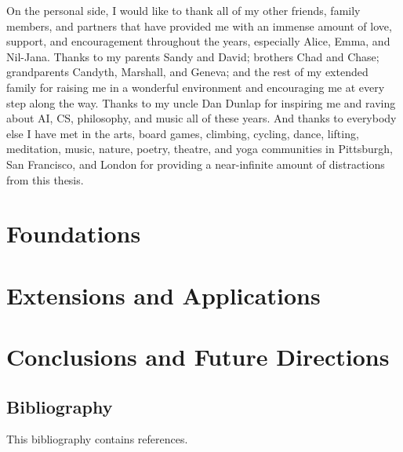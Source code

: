 \documentclass[12pt]{cmuthesis}
\begin{document}
\begin{acknowledgments}
  On the personal side, I would like to thank all of my
  other friends, family members, and partners that
  have provided me with an immense amount of love,
  support, and encouragement throughout the years,
  especially Alice, Emma, and Nil-Jana.
  Thanks to my parents Sandy and David;
  brothers Chad and Chase;
  grandparents Candyth, Marshall, and Geneva;
  and the rest of my extended family
  for raising me in a wonderful environment and
  encouraging me at every step along the way.
  Thanks to my uncle Dan Dunlap for inspiring me and
  raving about AI, CS, philosophy, and music all of these years.
  And thanks to everybody else I have met in the
  arts,
  board games,
  climbing,
  cycling,
  dance,
  lifting,
  meditation,
  music,
  nature,
  poetry,
  theatre, and
  yoga
  communities in Pittsburgh, San Francisco, and London for
  providing a near-infinite amount of distractions from
  this thesis.
\end{acknowledgments}

\pagestyle{plain}

\tableofcontents
\listoffigures
\listoftables
\listofalgorithms

\mainmatter




\part{Foundations}



\part{Extensions and Applications}




\part{Conclusions and Future Directions}


\chapter*{Bibliography}

\vspace{-25mm}
This bibliography contains  references.
\vspace{10mm}

\printbibliography[heading=none]
\end{document}
